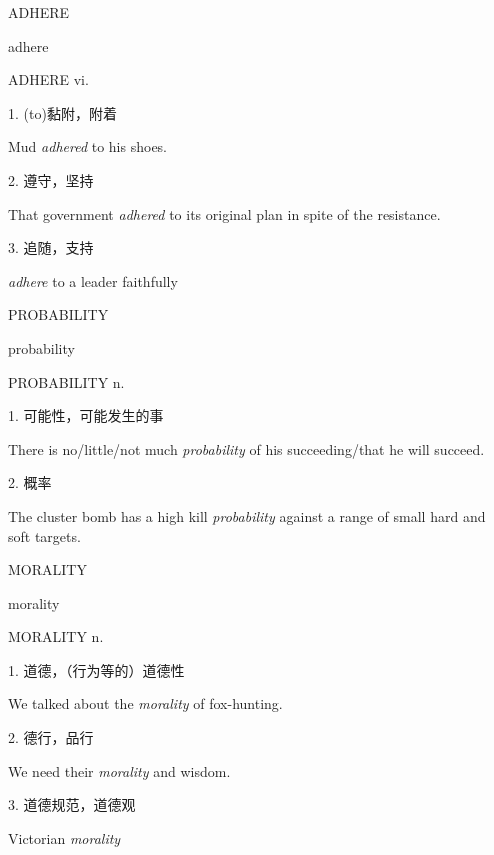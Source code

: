 \begin{flashcard}{
ADHERE

adhere
}
\begin{center}
ADHERE vi. 
\end{center}
1. (to)黏附，附着

Mud \textit{adhered} to his shoes.

2. 遵守，坚持

That government \textit{adhered} to its original plan in spite of the resistance.

3. 追随，支持

\textit{adhere} to a leader faithfully

\end{flashcard}
\begin{flashcard}{
PROBABILITY

probability
}
\begin{center}
PROBABILITY n. 
\end{center}
1. 可能性，可能发生的事

There is no/little/not much \textit{probability} of his succeeding/that he will succeed.

2. 概率

The cluster bomb has a high kill \textit{probability} against a range of small hard and soft targets.

\end{flashcard}
\begin{flashcard}{
MORALITY

morality
}
\begin{center}
MORALITY n. 
\end{center}
1. 道德，（行为等的）道德性

We talked about the \textit{morality} of fox-hunting.

2. 德行，品行

We need their \textit{morality} and wisdom.

3. 道德规范，道德观

Victorian \textit{morality}

\end{flashcard}
